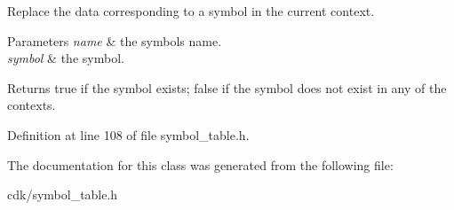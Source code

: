 Replace the data corresponding to a symbol in the current context.


\begin{DoxyParams}{Parameters}
{\em name} & the symbol\textquotesingle{}s name. \\
\hline
{\em symbol} & the symbol. \\
\hline
\end{DoxyParams}
\begin{DoxyReturn}{Returns}
{\ttfamily true} if the symbol exists; {\ttfamily false} if the symbol does not exist in any of the contexts. 
\end{DoxyReturn}


Definition at line 108 of file symbol\+\_\+table.\+h.



The documentation for this class was generated from the following file\+:\begin{DoxyCompactItemize}
\item 
cdk/symbol\+\_\+table.\+h\end{DoxyCompactItemize}
